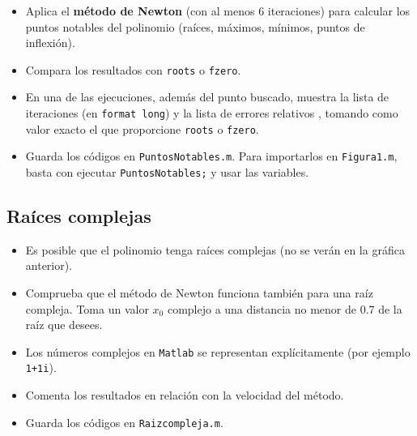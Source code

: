 \documentclass[12pt]{article}
\begin{document}
\begin{itemize}
  \item Aplica el \textbf{método de Newton} (con al menos 6 iteraciones) para calcular los puntos notables del polinomio (raíces, máximos, mínimos, puntos de inflexión).  
  \item Compara los resultados con \texttt{roots} o \texttt{fzero}.  
  \item En una de las ejecuciones, además del punto buscado, muestra la lista de iteraciones (en \texttt{format long}) y la lista de errores relativos , tomando como valor exacto el que proporcione \texttt{roots} o \texttt{fzero}.
  \item Guarda los códigos en \texttt{PuntosNotables.m}. Para importarlos en \texttt{Figura1.m}, basta con ejecutar \texttt{PuntosNotables;} y usar las variables.
\end{itemize}

\subsection*{Raíces complejas}

\begin{itemize}
  \item Es posible que el polinomio tenga raíces complejas (no se verán en la gráfica anterior).  
  \item Comprueba que el método de Newton funciona también para una raíz compleja. Toma un valor $x_0$ complejo a una distancia no menor de 0.7 de la raíz que desees.  
  \item Los números complejos en \texttt{Matlab} se representan explícitamente (por ejemplo \texttt{1+1i}).
  \item Comenta los resultados en relación con la velocidad del método.
  \item Guarda los códigos en \texttt{Raizcompleja.m}.
\end{itemize}
\end{document}
